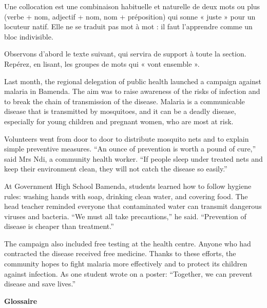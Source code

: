 \documentclass[11pt]{article}
\newcommand{\cle}[1]{{\popxbold\color{popdark}#1}}
\begin{document}
\begin{definition}[Collocation]
Une \cle{collocation} est une combinaison habituelle et naturelle de deux mots ou plus (verbe + nom, adjectif + nom, nom + préposition) qui sonne « juste » pour un locuteur natif. Elle ne se traduit pas mot à mot : il faut l'apprendre comme un bloc indivisible.
\end{definition}

Observons d'abord le texte suivant, qui servira de support à toute la section. Repérez, en lisant, les groupes de mots qui « vont ensemble ».

\begin{textebox}
Last month, the regional delegation of public health launched a campaign against malaria in Bamenda. The aim was to raise awareness of the risks of infection and to break the chain of transmission of the disease. Malaria is a communicable disease that is transmitted by mosquitoes, and it can be a deadly disease, especially for young children and pregnant women, who are most at risk.

Volunteers went from door to door to distribute mosquito nets and to explain simple preventive measures. “An ounce of prevention is worth a pound of cure,” said Mrs Ndi, a community health worker. “If people sleep under treated nets and keep their environment clean, they will not catch the disease so easily.”

At Government High School Bamenda, students learned how to follow hygiene rules: washing hands with soap, drinking clean water, and covering food. The head teacher reminded everyone that contaminated water can transmit dangerous viruses and bacteria. “We must all take precautions,” he said. “Prevention of disease is cheaper than treatment.”

The campaign also included free testing at the health centre. Anyone who had contracted the disease received free medicine. Thanks to these efforts, the community hopes to fight malaria more effectively and to protect its children against infection. As one student wrote on a poster: “Together, we can prevent disease and save lives.”
\end{textebox}

\textbf{Glossaire}
\end{document}

